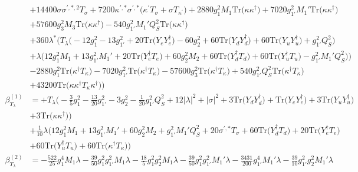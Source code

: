 {\begin{align}
 &+14400 \sigma \sigma^{\prime,*,2} T_{\sigma} +7200 \kappa^{\prime,*} \sigma^{\prime,*} \Big(\kappa^\prime T_{\sigma}  + \sigma T_{\kappa^\prime} \Big)+2880 g_{1}^{2} M_1 \mbox{Tr}\Big({\kappa  \kappa^{\dagger}}\Big) +7020 g_{1'}^{2} M_1' \mbox{Tr}\Big({\kappa  \kappa^{\dagger}}\Big) \nonumber \\ 
 &+57600 g_{3}^{2} M_3 \mbox{Tr}\Big({\kappa  \kappa^{\dagger}}\Big) -540 g_{1'}^{2} M_1' Q_{S}^{2} \mbox{Tr}\Big({\kappa  \kappa^{\dagger}}\Big) \nonumber \\ 
 &+360 \lambda^* \Big(T_{\lambda} \Big(-12 g_{1}^{2}  -13 g_{1'}^{2}  + 20 \mbox{Tr}\Big({Y_e  Y_{e}^{\dagger}}\Big)  -60 g_{2}^{2}  + 60 \mbox{Tr}\Big({Y_d  Y_{d}^{\dagger}}\Big)  + 60 \mbox{Tr}\Big({Y_u  Y_{u}^{\dagger}}\Big)  + g_{1'}^{2} Q_{S}^{2} \Big)\nonumber \\ 
 &+\lambda \Big(12 g_{1}^{2} M_1  + 13 g_{1'}^{2} M_1'  + 20 \mbox{Tr}\Big({Y_{e}^{\dagger}  T_e}\Big)  + 60 g_{2}^{2} M_2  + 60 \mbox{Tr}\Big({Y_{d}^{\dagger}  T_d}\Big)  + 60 \mbox{Tr}\Big({Y_{u}^{\dagger}  T_u}\Big)  - g_{1'}^{2} M_1' Q_{S}^{2} \Big)\Big)\nonumber \\ 
 &-2880 g_{1}^{2} \mbox{Tr}\Big({\kappa^{\dagger}  T_{\kappa}}\Big) -7020 g_{1'}^{2} \mbox{Tr}\Big({\kappa^{\dagger}  T_{\kappa}}\Big) -57600 g_{3}^{2} \mbox{Tr}\Big({\kappa^{\dagger}  T_{\kappa}}\Big) +540 g_{1'}^{2} Q_{S}^{2} \mbox{Tr}\Big({\kappa^{\dagger}  T_{\kappa}}\Big) \nonumber \\ 
 &+43200 \mbox{Tr}\Big({\kappa  \kappa^{\dagger}  T_{\kappa}  \kappa^{\dagger}}\Big) \Big)\\ 
\beta_{T_{\lambda}}^{(1)} & =  
+T_{\lambda} \Big(-\frac{3}{5} g_{1}^{2} -\frac{13}{20} g_{1'}^{2} -3 g_{2}^{2} -\frac{1}{20} g_{1'}^{2} Q_{S}^{2} +12 |\lambda|^2 +|\sigma|^2+3 \mbox{Tr}\Big({Y_d  Y_{d}^{\dagger}}\Big) +\mbox{Tr}\Big({Y_e  Y_{e}^{\dagger}}\Big)+3 \mbox{Tr}\Big({Y_u  Y_{u}^{\dagger}}\Big) \nonumber \\ 
 &+3 \mbox{Tr}\Big({\kappa  \kappa^{\dagger}}\Big) \Big)\nonumber \\ 
 &+\frac{1}{10} \lambda \Big(12 g_{1}^{2} M_1 +13 g_{1'}^{2} M_1' +60 g_{2}^{2} M_2 +g_{1'}^{2} M_1' Q_{S}^{2} +20 \sigma^{\prime,*} T_{\sigma} +60 \mbox{Tr}\Big({Y_{d}^{\dagger}  T_d}\Big) +20 \mbox{Tr}\Big({Y_{e}^{\dagger}  T_e}\Big) \nonumber \\ 
 &+60 \mbox{Tr}\Big({Y_{u}^{\dagger}  T_u}\Big) +60 \mbox{Tr}\Big({\kappa^{\dagger}  T_{\kappa}}\Big) \Big)\\ 
\beta_{T_{\lambda}}^{(2)} & =  
-\frac{522}{25} g_{1}^{4} M_1 \lambda -\frac{39}{50} g_{1}^{2} g_{1'}^{2} M_1 \lambda -\frac{18}{5} g_{1}^{2} g_{2}^{2} M_1 \lambda -\frac{39}{50} g_{1}^{2} g_{1'}^{2} M_1' \lambda -\frac{3431}{200} g_{1'}^{4} M_1' \lambda -\frac{39}{10} g_{1'}^{2} g_{2}^{2} M_1' \lambda \nonumber \\ 

\end{align}}
